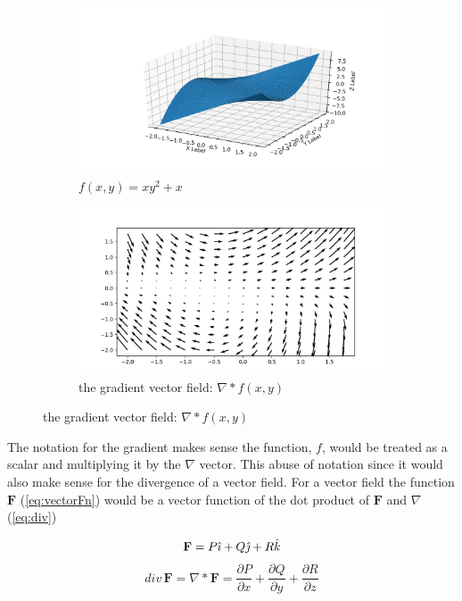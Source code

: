 \documentclass[12pt, letterpaper]{article}
\begin{document}
\begin{figure}[!h]
  \centering
  \begin{subfigure}[b]{.45\linewidth}
    \includegraphics[width=\linewidth]{Basics/multifn}
    \caption{$f(x,y) = xy^2 + x$}
  \end{subfigure}
  \begin{subfigure}[b]{.5\linewidth}
    \includegraphics[width=\linewidth]{Basics/gradient}
    \caption{the gradient vector field: $\nabla * f(x,y)$}
  \end{subfigure}
\end{figure}

The notation for the gradient makes sense the function, $f$, would be treated as a scalar and
multiplying it by the $\nabla$ vector. This abuse of notation since it would also make sense for the
divergence of a vector field. For a vector field the function $\mathbf{F}$ (\ref{eq:vectorFn}) would be 
a vector function of the dot product of $\mathbf{F}$ and $\nabla$ (\ref{eq:div})

\begin{equation}
  \mathbf{F} = P\hat{\imath} + Q\hat{\jmath} + R\hat{k} \\
  \label{eq:vectorFn}
\end{equation}
\begin{equation}
  div \, \mathbf{F} = \nabla * \mathbf{F} = \frac{\partial P}{\partial x} + \frac{\partial Q}{\partial y} +
 \frac{\partial R}{\partial z}
  \label{eq:div}
\end{equation}
\end{document}

